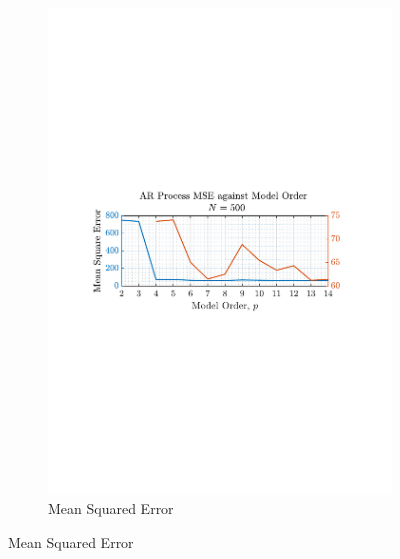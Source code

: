 \documentclass[12pt]{article}
\begin{document}
\begin{figure}[H]
\begin{subfigure}{0.49\textwidth}
			\includegraphics[trim={2.2cm 11.2cm 3.15cm  11.2cm}, clip, width=\textwidth]{../MATLAB/figures/q1_4b_fig16.pdf} 
			\captionsetup{justification=centering}
			\caption{Mean Squared Error}
		\end{subfigure}
		\label{fig: 1-4b}
	\end{figure}
\end{document}

